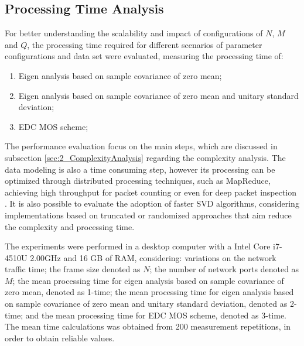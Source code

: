 \subsection{Processing Time Analysis}
\label{sec:2_ProcessingAnalysis}
For better understanding the scalability and impact of configurations of $N$, $M$ and $Q$, the processing time required for different scenarios of parameter configurations and data set were evaluated, measuring the processing time of: 

\begin{enumerate}
	\item Eigen analysis based on sample covariance of zero mean;
	\item Eigen analysis based on sample covariance of zero mean and unitary standard deviation;
	\item EDC MOS scheme;
\end{enumerate}

The performance evaluation focus on the main steps, which are discussed in subsection \ref{sec:2_ComplexityAnalysis} regarding the complexity analysis. The data modeling is also a time consuming step, however its processing can be optimized through distributed processing techniques, such as MapReduce, achieving high throughput for packet counting or even for deep packet inspection \cite{Vieira2013}. It is also possible to evaluate the adoption of faster SVD algorithms, considering implementations based on truncated or randomized approaches \cite{halko2011finding} that aim reduce the complexity and processing time.

The experiments were performed in a desktop computer with a Intel Core i7-4510U 2.00GHz and 16 GB of RAM, considering: variations on the network traffic time; the frame size denoted as $N$; the number of network ports denoted as $M$; the mean processing time for eigen analysis based on sample covariance of zero mean, denoted as 1-time; the mean processing time for eigen analysis based on sample covariance of zero mean and unitary standard deviation, denoted as 2-time; and the mean processing time for EDC MOS scheme, denoted as 3-time. The mean time calculations was obtained from 200 measurement repetitions, in order to obtain reliable values.

